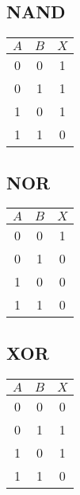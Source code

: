 \subsection{NAND}

\begin{table}[H]
    \centering
    \begin{tabular}{|c|c|c|}
        \hline
        \cellcolor{gray!40} $A$ & \cellcolor{gray!40} $B$ & \cellcolor{gray!40} $X$ \\
        \hline
        0 & 0 & 1 \\
        \hline
        0 & 1 & 1 \\
        \hline
        1 & 0 & 1 \\
        \hline
        1 & 1 & 0 \\
        \hline
    \end{tabular}
\end{table}

\subsection{NOR}

\begin{table}[H]
    \centering
    \begin{tabular}{|c|c|c|}
        \hline
        \cellcolor{gray!40} $A$ & \cellcolor{gray!40} $B$ & \cellcolor{gray!40} $X$ \\
        \hline
        0 & 0 & 1 \\
        \hline
        0 & 1 & 0 \\
        \hline
        1 & 0 & 0 \\
        \hline
        1 & 1 & 0 \\
        \hline
    \end{tabular}
\end{table}

\subsection{XOR}

\begin{table}[H]
    \centering
    \begin{tabular}{|c|c|c|}
        \hline
        \cellcolor{gray!40} $A$ & \cellcolor{gray!40} $B$ & \cellcolor{gray!40} $X$ \\
        \hline
        0 & 0 & 0 \\
        \hline
        0 & 1 & 1 \\
        \hline
        1 & 0 & 1 \\
        \hline
        1 & 1 & 0 \\
        \hline
    \end{tabular}
\end{table}

